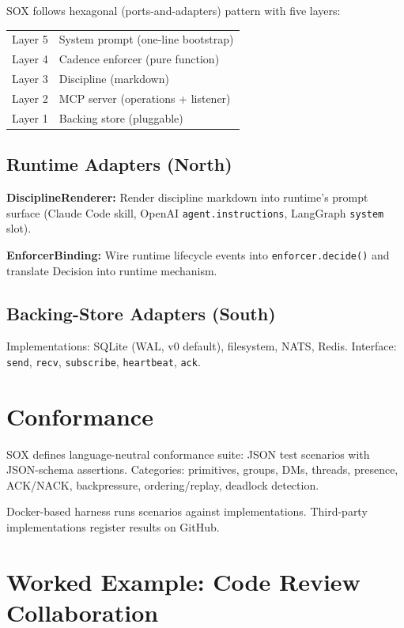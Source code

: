 \documentclass[11pt]{article}
\begin{document}
SOX follows hexagonal (ports-and-adapters) pattern with five layers:

\begin{center}
\begin{tabular}{ll}
  Layer 5 & System prompt (one-line bootstrap) \\
  Layer 4 & Cadence enforcer (pure function) \\
  Layer 3 & Discipline (markdown) \\
  Layer 2 & MCP server (operations + listener) \\
  Layer 1 & Backing store (pluggable)
\end{tabular}
\end{center}

\subsection{Runtime Adapters (North)}

\textbf{DisciplineRenderer:} Render discipline markdown into runtime's prompt surface (Claude Code skill, OpenAI \texttt{agent.instructions}, LangGraph \texttt{system} slot).

\textbf{EnforcerBinding:} Wire runtime lifecycle events into \texttt{enforcer.decide()} and translate Decision into runtime mechanism.

\subsection{Backing-Store Adapters (South)}

Implementations: SQLite (WAL, v0 default), filesystem, NATS, Redis. Interface: \texttt{send}, \texttt{recv}, \texttt{subscribe}, \texttt{heartbeat}, \texttt{ack}.

\section{Conformance}

SOX defines language-neutral conformance suite: JSON test scenarios with JSON-schema assertions. Categories: primitives, groups, DMs, threads, presence, ACK/NACK, backpressure, ordering/replay, deadlock detection.

Docker-based harness runs scenarios against implementations. Third-party implementations register results on GitHub.

\section{Worked Example: Code Review Collaboration}
\end{document}
